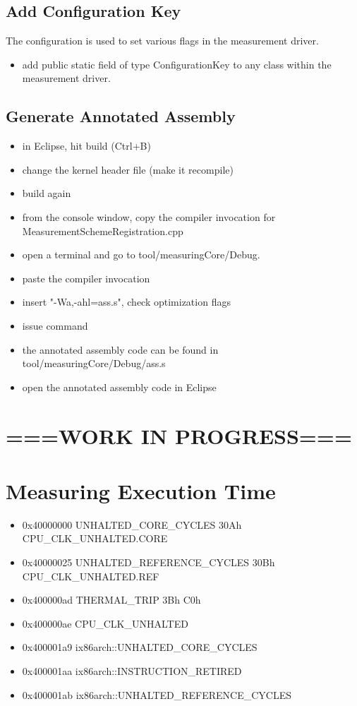 \documentclass[a4paper,12pt]{article}
\begin{document}
\subsection{Add Configuration Key}
The configuration is used to set various flags in the measurement driver.
\begin{itemize}
\item add public static field of type ConfigurationKey to any class within the
measurement driver.
\end{itemize}

\subsection{Generate Annotated Assembly}
\begin{itemize}
\item in Eclipse, hit build (Ctrl+B)
\item change the kernel header file (make it recompile)
\item build again
\item from the console window, copy the compiler invocation for
MeasurementSchemeRegistration.cpp
\item open a terminal and go to tool/measuringCore/Debug.
\item paste the compiler invocation
\item insert "-Wa,-ahl=ass.s", check optimization flags
\item issue command
\item the annotated assembly code can be found in tool/measuringCore/Debug/ass.s
\item open the annotated assembly code in Eclipse
\end{itemize}

\section{===WORK IN PROGRESS===}
\section{Measuring Execution Time}
\begin{itemize}
\item 0x40000000   UNHALTED\_CORE\_CYCLES 30Ah CPU\_CLK\_UNHALTED.CORE
\item 0x40000025   UNHALTED\_REFERENCE\_CYCLES 30Bh CPU\_CLK\_UNHALTED.REF
\item 0x400000ad   THERMAL\_TRIP 3Bh C0h 
\item 0x400000ae   CPU\_CLK\_UNHALTED
\item 0x400001a9   ix86arch::UNHALTED\_CORE\_CYCLES
\item 0x400001aa   ix86arch::INSTRUCTION\_RETIRED
\item 0x400001ab   ix86arch::UNHALTED\_REFERENCE\_CYCLES 
\end{itemize}
\end{document}
